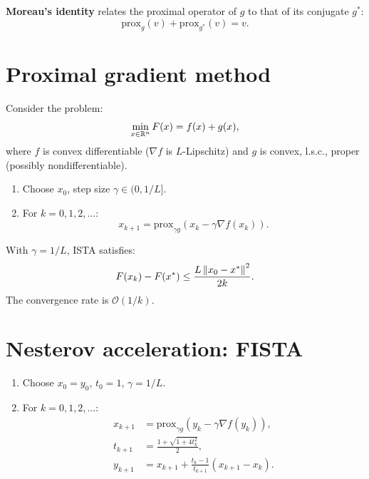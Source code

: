 \begin{definition}
\textbf{Moreau's identity} relates the proximal operator of $g$ to that of
its conjugate $g^*$:
\[
  \mathrm{prox}_g(v) + \mathrm{prox}_{g^*}(v) = v.
\]
\end{definition}

\section{Proximal gradient method}

\begin{definition}
Consider the problem:
\[
  \min_{x \in \mathbb{R}^n} F(x) = f(x) + g(x),
\]
where $f$ is convex differentiable ($\nabla f$ is $L$-Lipschitz) and $g$ is
convex, l.s.c., proper (possibly nondifferentiable).
\end{definition}

\begin{algorithme}[title=\textbf{Proximal Gradient (ISTA)}]
\begin{enumerate}
  \item Choose $x_0$, step size $\gamma \in (0, 1/L]$.
  \item For $k = 0, 1, 2, \ldots$:
  \[
    x_{k+1} = \mathrm{prox}_{\gamma g}\!\left(
      x_k - \gamma \nabla f(x_k)\right).
  \]
\end{enumerate}
\end{algorithme}

\begin{theorem}
With $\gamma = 1/L$, ISTA satisfies:
\[
  F(x_k) - F(x^*) \leq \frac{L \left\| x_0 - x^* \right\|^2}{2k}.
\]
The convergence rate is $\mathcal{O}(1/k)$.
\end{theorem}

\section{Nesterov acceleration: FISTA}

\begin{algorithme}[title=\textbf{FISTA (Fast ISTA)}]
\begin{enumerate}
  \item Choose $x_0 = y_0$, $t_0 = 1$, $\gamma = 1/L$.
  \item For $k = 0, 1, 2, \ldots$:
  \begin{align*}
    x_{k+1} &= \mathrm{prox}_{\gamma g}\!\left(
      y_k - \gamma \nabla f(y_k)\right), \\
    t_{k+1} &= \frac{1 + \sqrt{1 + 4 t_k^2}}{2}, \\
    y_{k+1} &= x_{k+1} + \frac{t_k - 1}{t_{k+1}}(x_{k+1} - x_k).
  \end{align*}
\end{enumerate}
\end{algorithme}

